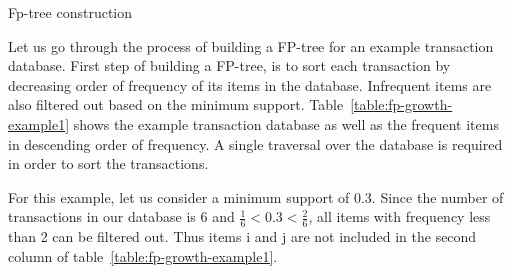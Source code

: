 \begin{algorithm}[h]
	\SetAlgoLined\DontPrintSemicolon
	\setcounter{AlgoLine}{0}
	\caption{Fp-tree construction}
	\label{Algorithm:FP-tree}
\end{algorithm}  

Let us go through the process of building a FP-tree for an example transaction database. First step of building a FP-tree, is to sort each transaction by decreasing order of frequency of its items in the database. Infrequent items are also filtered out based on the minimum support. Table~\ref{table:fp-growth-example1} shows the example transaction database as well as the frequent items in descending order of frequency. A single traversal over the database is required in order to sort the transactions.

For this example, let us consider a minimum support of 0.3. Since the number of transactions in our database is 6 and $ \frac{1}{6} < 0.3 < \frac{2}{6} $, all items with frequency less than 2 can be filtered out. Thus items i and j are not included in the second column of table~\ref{table:fp-growth-example1}. 

